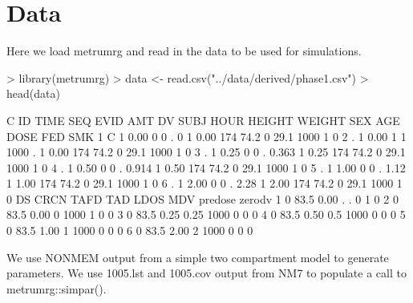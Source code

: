 \section{Data}
Here we load metrumrg and read in the data to be used
for simulations.
\begin{Schunk}
\begin{Sinput}
> library(metrumrg)
> data <- read.csv("../data/derived/phase1.csv")
> head(data)
\end{Sinput}
\begin{Soutput}
  C ID TIME SEQ EVID  AMT    DV SUBJ HOUR HEIGHT WEIGHT SEX  AGE DOSE FED SMK
1 C  1 0.00   0    0    .     0    1 0.00    174   74.2   0 29.1 1000   1   0
2 .  1 0.00   1    1 1000     .    1 0.00    174   74.2   0 29.1 1000   1   0
3 .  1 0.25   0    0    . 0.363    1 0.25    174   74.2   0 29.1 1000   1   0
4 .  1 0.50   0    0    . 0.914    1 0.50    174   74.2   0 29.1 1000   1   0
5 .  1 1.00   0    0    .  1.12    1 1.00    174   74.2   0 29.1 1000   1   0
6 .  1 2.00   0    0    .  2.28    1 2.00    174   74.2   0 29.1 1000   1   0
  DS CRCN TAFD  TAD LDOS MDV predose zerodv
1  0 83.5 0.00    .    .   0       1      0
2  0 83.5 0.00    0 1000   1       0      0
3  0 83.5 0.25 0.25 1000   0       0      0
4  0 83.5 0.50  0.5 1000   0       0      0
5  0 83.5 1.00    1 1000   0       0      0
6  0 83.5 2.00    2 1000   0       0      0
\end{Soutput}
\end{Schunk}
We use NONMEM output from a simple two compartment model to generate parameters.
We use 1005.lst and 1005.cov output from NM7 to populate a call to metrumrg::simpar().
